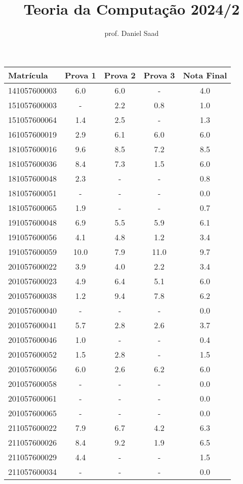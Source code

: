 \documentclass{article}
\title{ Teoria da Computação 2024/2}
\date{}
\author{ prof. Daniel Saad}
\begin{document}
 \maketitle
    \begin{longtable}{|l|c|c|c|c|}
    \hline
Matrícula & Prova 1 & Prova 2 & Prova 3 & Nota Final\\\hline \endhead   
141057600003 & 6.0 & 6.0 & - & 4.0\\\hline
151057600003 & - & 2.2 & 0.8 & 1.0\\\hline
151057600064 & 1.4 & 2.5 & - & 1.3\\\hline
161057600019 & 2.9 & 6.1 & 6.0 & 6.0\\\hline
181057600016 & 9.6 & 8.5 & 7.2 & 8.5\\\hline
181057600036 & 8.4 & 7.3 & 1.5 & 6.0\\\hline
181057600048 & 2.3 & - & - & 0.8\\\hline
181057600051 & - & - & - & 0.0\\\hline
181057600065 & 1.9 & - & - & 0.7\\\hline
191057600048 & 6.9 & 5.5 & 5.9 & 6.1\\\hline
191057600056 & 4.1 & 4.8 & 1.2 & 3.4\\\hline
191057600059 & 10.0 & 7.9 & 11.0 & 9.7\\\hline
201057600022 & 3.9 & 4.0 & 2.2 & 3.4\\\hline
201057600023 & 4.9 & 6.4 & 5.1 & 6.0\\\hline
201057600038 & 1.2 & 9.4 & 7.8 & 6.2\\\hline
201057600040 & - & - & - & 0.0\\\hline
201057600041 & 5.7 & 2.8 & 2.6 & 3.7\\\hline
201057600046 & 1.0 & - & - & 0.4\\\hline
201057600052 & 1.5 & 2.8 & - & 1.5\\\hline
201057600056 & 6.0 & 2.6 & 6.2 & 6.0\\\hline
201057600058 & - & - & - & 0.0\\\hline
201057600061 & - & - & - & 0.0\\\hline
201057600065 & - & - & - & 0.0\\\hline
211057600022 & 7.9 & 6.7 & 4.2 & 6.3\\\hline
211057600026 & 8.4 & 9.2 & 1.9 & 6.5\\\hline
211057600029 & 4.4 & - & - & 1.5\\\hline
211057600034 & - & - & - & 0.0\\\hline

\end{longtable}
\end{document}
